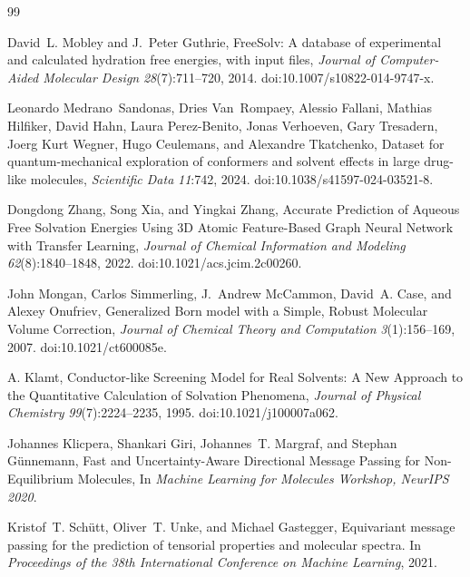 \documentclass{article}
\begin{document}
\newpage
\begin{thebibliography}{99}

David~L. Mobley and J.~Peter Guthrie, FreeSolv: A database of experimental and calculated hydration free energies, with input files,
{\it Journal of Computer-Aided Molecular Design} {\it 28}(7):711--720, 2014.
doi:10.1007/s10822-014-9747-x.

Leonardo Medrano~Sandonas, Dries Van~Rompaey, Alessio Fallani, Mathias Hilfiker, David Hahn, Laura Perez-Benito, Jonas Verhoeven, Gary Tresadern, Joerg Kurt Wegner, Hugo Ceulemans, and Alexandre Tkatchenko, Dataset for quantum-mechanical exploration of conformers and solvent effects in large drug-like molecules,
{\it Scientific Data} {\it 11}:742, 2024.
doi:10.1038/s41597-024-03521-8.

Dongdong Zhang, Song Xia, and Yingkai Zhang,
Accurate Prediction of Aqueous Free Solvation Energies Using 3D Atomic Feature-Based Graph Neural Network with Transfer Learning,
{\it Journal of Chemical Information and Modeling} {\it 62}(8):1840--1848, 2022.
doi:10.1021/acs.jcim.2c00260.


John Mongan, Carlos Simmerling, J.~Andrew McCammon, David~A. Case, and Alexey Onufriev,
Generalized Born model with a Simple, Robust Molecular Volume Correction,
{\it Journal of Chemical Theory and Computation} {\it 3}(1):156--169, 2007.
doi:10.1021/ct600085e.

A. Klamt,
Conductor-like Screening Model for Real Solvents: A New Approach to the Quantitative Calculation of Solvation Phenomena,
{\it Journal of Physical Chemistry} {\it 99}(7):2224--2235, 1995.
doi:10.1021/j100007a062.

Johannes Klicpera, Shankari Giri, Johannes~T. Margraf, and Stephan G\"unnemann,
Fast and Uncertainty-Aware Directional Message Passing for Non-Equilibrium Molecules,
In {\it Machine Learning for Molecules Workshop, NeurIPS 2020}.

Kristof~T. Sch\"utt, Oliver~T. Unke, and Michael Gastegger,
Equivariant message passing for the prediction of tensorial properties and molecular spectra.
In {\it Proceedings of the 38th International Conference on Machine Learning}, 2021.


\end{thebibliography}
\end{document}
